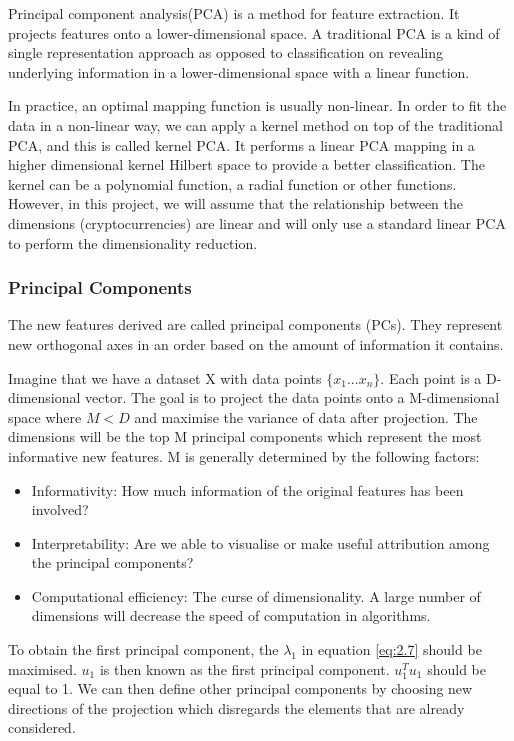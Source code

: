 \documentclass[11pt]{article} %
\theoremstyle{plain}
\theoremstyle{definition}
\begin{document}
Principal component analysis(PCA) is a method for feature extraction. It projects features onto a lower-dimensional space. A traditional PCA is a kind of single representation approach as opposed to classification on revealing underlying information in a lower-dimensional space with a linear function.

In practice, an optimal mapping function is usually non-linear. In order to fit the data in a non-linear way, we can apply a kernel method on top of the traditional PCA, and this is called kernel PCA. It performs a linear PCA mapping in a higher dimensional kernel Hilbert space to provide a better classification. The kernel can be a polynomial function, a radial function or other functions\cite{hessam/kpca:2014}. However, in this project, we will assume that the relationship between the dimensions (cryptocurrencies) are linear and will only use a standard linear PCA to perform the dimensionality reduction.

\subsubsection{Principal Components}

The new features derived are called principal components (PCs). They represent new orthogonal axes in an order based on the amount of information it contains.

Imagine that we have a dataset X with data points $\{{x_1} ... {x_n}\}$. Each point is a D-dimensional vector. The goal is to project the data points onto a M-dimensional space where $M < D$ and maximise the variance of data after projection. The dimensions will be the top M principal components which represent the most informative new features. M is generally determined by the following factors:

\begin{itemize}
  \item Informativity: How much information of the original features has been involved?
  \item Interpretability: Are we able to visualise or make useful attribution among the principal components?
  \item Computational efficiency: The curse of dimensionality. A large number of dimensions will decrease the speed of computation in algorithms.
\end{itemize}

To obtain the first principal component, the $\lambda_{1}$ in equation \eqref{eq:2.7} should be maximised. $u_{1}$ is then known as the first principal component. $u_{1}^{T}u_{1}$ should be equal to 1. We can then define other principal components by choosing new directions of the projection which disregards the elements that are already considered.
\end{document}
